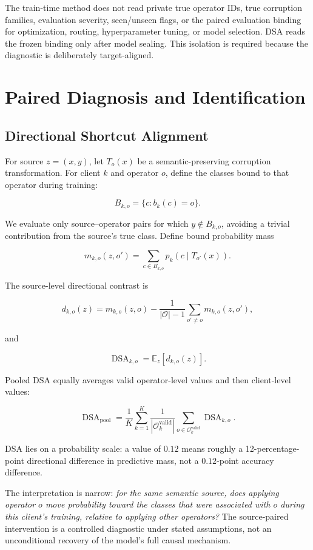 \documentclass[10pt,twocolumn]{article}
\begin{document}
The train-time method does not read private true operator IDs, true corruption families, evaluation severity, seen/unseen flags, or the paired evaluation binding for optimization, routing, hyperparameter tuning, or model selection. DSA reads the frozen binding only after model sealing. This isolation is required because the diagnostic is deliberately target-aligned.

\section{Paired Diagnosis and Identification}

\subsection{Directional Shortcut Alignment}

For source \(z=(x,y)\), let \(T_o(x)\) be a semantic-preserving corruption transformation. For client \(k\) and operator \(o\), define the classes bound to that operator during training:

\[
B_{k,o}=\{c:b_k(c)=o\}.
\]

We evaluate only source--operator pairs for which \(y\notin B_{k,o}\), avoiding a trivial contribution from the source's true class. Define bound probability mass

\[
m_{k,o}(z,o')=\sum_{c\in B_{k,o}}p_k(c\mid T_{o'}(x)).
\]

The source-level directional contrast is

\[
d_{k,o}(z)=m_{k,o}(z,o)
-\frac{1}{|\mathcal O|-1}\sum_{o'\neq o}m_{k,o}(z,o'),
\]

and

\[
\operatorname{DSA}_{k,o}=\mathbb E_z[d_{k,o}(z)].
\]

Pooled DSA equally averages valid operator-level values and then client-level values:

\[
\operatorname{DSA}_{\mathrm{pool}}
=\frac1K\sum_{k=1}^{K}
\frac1{|\mathcal O_k^{\mathrm{valid}}|}
\sum_{o\in\mathcal O_k^{\mathrm{valid}}}\operatorname{DSA}_{k,o}.
\]

DSA lies on a probability scale: a value of \(0.12\) means roughly a 12-percentage-point directional difference in predictive mass, not a \(0.12\)-point accuracy difference.

The interpretation is narrow: \emph{for the same semantic source, does applying operator \(o\) move probability toward the classes that were associated with \(o\) during this client's training, relative to applying other operators?} The source-paired intervention is a controlled diagnostic under stated assumptions, not an unconditional recovery of the model's full causal mechanism.
\end{document}
